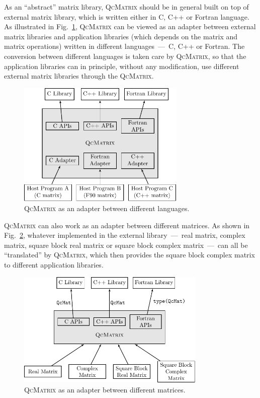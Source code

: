 \documentclass[a4paper,11pt,twoside,openright]{book}
\begin{document}
As an ``abstract'' matrix library, \textsc{QcMatrix} should be in general built on top of
external matrix library, which is written either in C, C++ or Fortran language. As illustrated
in Fig.~\ref{fig-lang-adapter}, \textsc{QcMatrix} can be viewed as an adapter between external
matrix libraries and application libraries (which depends on the matrix and matrix operations)
written in different languages~---~C, C++ or Fortran. The conversion between different languages
is taken care by \textsc{QcMatrix}, so that the application libraries can in principle, without
any modification, use different external matrix libraries through the \textsc{QcMatrix}.
\begin{figure}[htbp]
  \centering
  \includegraphics[width=8cm]{lang_adapter.pdf}
  \caption{\textsc{QcMatrix} as an adapter between different languages.}
  \label{fig-lang-adapter}
\end{figure}

\textsc{QcMatrix} can also work as an adapter between different matrices. As shown in
Fig.~\ref{fig-matrix-adapter}, whatever implemented in the external library~---~real
matrix, complex matrix, square block real matrix or square block complex matrix~---~can
all be ``translated'' by \textsc{QcMatrix}, which then provides the square block complex
matrix to different application libraries.
\begin{figure}[htbp]
  \centering
  \includegraphics[width=9cm]{matrix_adapter.pdf}
  \caption{\textsc{QcMatrix} as an adapter between different matrices.}
  \label{fig-matrix-adapter}
\end{figure}
\end{document}
